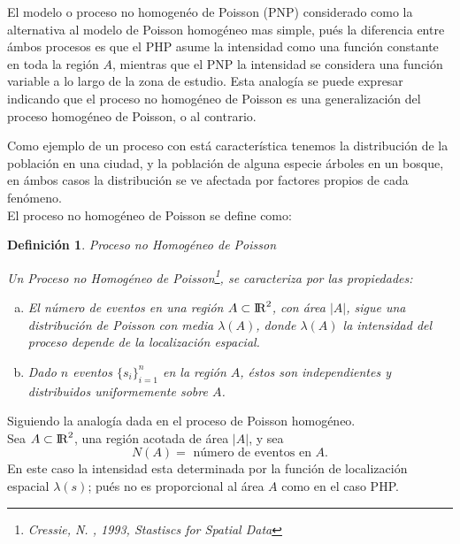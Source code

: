 \documentclass[12pt]{report}
\newtheorem{defi}{{\bf Definición}}[chapter]
\begin{document}
		El modelo o proceso no homogenéo de Poisson (PNP) considerado como la alternativa al modelo de Poisson homogéneo mas simple, pués la diferencia entre ámbos procesos es que el PHP asume la intensidad como una función constante en toda la región $A$, mientras que el PNP la intensidad se considera  una función variable a lo largo de la zona de estudio. Esta analogía se puede expresar indicando que el proceso no homogéneo de Poisson es una generalización del proceso homogéneo de Poisson, o al contrario.
		
		Como ejemplo de un proceso con está característica tenemos la distribución de la población en una ciudad, y la población de alguna especie árboles en un bosque, en ámbos casos la distribución se ve afectada por  factores propios de cada fenómeno. \\
		
		
		El proceso no homogéneo de Poisson se define como:
		
		
		\begin{defi}{Proceso no Homogéneo de Poisson}
			
			Un Proceso no  Homogéneo de Poisson{\footnote{Cressie, N. , 1993, Stastiscs for Spatial Data}}, se caracteriza por las propiedades:
			
			\begin{enumerate}[a.-]
				
				\item El número de eventos  en una región $ A \subset {\rm I\!R}^{2} $, con área $|A|$, sigue una distribución de Poisson   con media  $ \lambda(A) $, donde $ \lambda(A) $ la intensidad del proceso depende de la localización espacial.
				
				\item  Dado $n$ eventos $\{s_{i}\}_{i=1}^{n}$ en la región $A$, éstos son independientes y  distribuidos uniformemente sobre $A$.
				
			\end{enumerate}
			
			
		\end{defi}
		
		
		
		Siguiendo la analogía dada en el proceso de Poisson homogéneo. \\ 
		Sea $ A \subset {\rm I\!R}^{2} $,  una región acotada  de  área $|A|$, y sea \[ N(A) =   {\text{ número de eventos  en  $A$}}.\] En este caso la intensidad  esta  determinada por la función de localización espacial  $\lambda(s)$;  pués  no es proporcional al área  $A$ como en el caso PHP. \\
		
\end{document}
